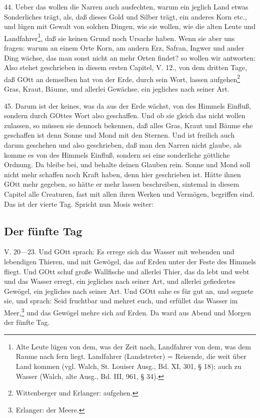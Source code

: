 44. Ueber das wollen die Narren auch ausfechten, warum ein jeglich Land etwas Sonderliches trägt, als, daß dieses Gold und Silber trägt, ein anderes Korn etc., und lügen mit Gewalt von solchen Dingen, wie sie wollen, wie die alten Leute und Landfahrer\footnote{Alte Leute lügen von dem, was der Zeit nach, Landfahrer von dem, was dem Raume nach fern liegt. Landfahrer (Landstreter) = Reisende, die weit über Land kommen (vgl. Walch, St. Louiser Ausg., Bd. XI, 301, § 18); auch zu Wasser (Walch, alte Ausg., Bd. III, 961, § 34).}, daß sie keinen Grund noch Ursache haben. Wenn sie aber uns fragen: warum an einem Orte Korn, am andern Erz, Safran, Ingwer und ander Ding wächse, das man sonst nicht an mehr Orten findet? so wollen wir antworten: Also stehet geschrieben in diesem ersten Capitel, V. 12., von dem dritten Tage, daß GOtt an demselben hat von der Erde, durch sein Wort, lassen aufgehen\footnote{Wittenberger und Erlanger: aufgehen.} Gras, Kraut, Bäume, und allerlei Gewächse, ein jegliches nach seiner Art.

45. Darum ist der keines, was da aus der Erde wächst, von des Himmels Einfluß, sondern durch GOttes Wort also geschaffen. Und ob sie gleich das nicht wollen zulassen, so müssen sie dennoch bekennen, daß alles Gras, Kraut und Bäume ehe geschaffen ist denn Sonne und Mond mit den Sternen. Und ist freilich auch darum geschehen und also geschrieben, daß man den Narren nicht glaube, als komme es von des Himmels Einfluß, sondern sei eine sonderliche göttliche Ordnung. Da bleibe bei, und behalte deinen Glauben rein. Sonne und Mond soll nicht mehr schaffen noch Kraft haben, denn hier geschrieben ist. Hätte ihnen GOtt mehr gegeben, so hätte er mehr lassen beschreiben, sintemal in diesem Capitel alle Creaturen, fast mit allen ihren Werken und Vermögen, begriffen sind. Das ist der vierte Tag. Spricht nun Mosis weiter:

\subsection{Der fünfte Tag}

\begin{schriftzitat}
V. 20—23. Und GOtt sprach: Es errege sich das Wasser mit webenden und lebendigen Thieren, und mit Gewögel, das auf Erden unter der Feste des Himmels fliegt. Und GOtt schuf große Wallfische und allerlei Thier, das da lebt und webt und das Wasser erregt, ein jegliches nach seiner Art, und allerlei gefiedertes Gewögel, ein jegliches nach seiner Art. Und GOtt sahe es für gut an, und segnete sie, und sprach: Seid fruchtbar und mehret euch, und erfüllet das Wasser im Meer,\footnote{Erlanger: der Meere.} und das Gewögel mehre sich auf Erden. Da ward aus Abend und Morgen der fünfte Tag.
\end{schriftzitat}

